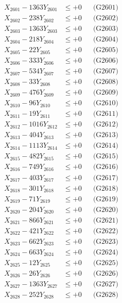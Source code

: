 \documentclass[a4paper,10pt]{article}
\begin{document}
{\begin{align}
\allowbreak
X_{2601} - 1363Y_{2601} &\leq +0 && \text{(G2601)} \\
X_{2602} - 238Y_{2602} &\leq +0 && \text{(G2602)} \\
X_{2603} - 1363Y_{2603} &\leq +0 && \text{(G2603)} \\
X_{2604} - 218Y_{2604} &\leq +0 && \text{(G2604)} \\
X_{2605} - 22Y_{2605} &\leq +0 && \text{(G2605)} \\
X_{2606} - 333Y_{2606} &\leq +0 && \text{(G2606)} \\
X_{2607} - 534Y_{2607} &\leq +0 && \text{(G2607)} \\
X_{2608} - 33Y_{2608} &\leq +0 && \text{(G2608)} \\
X_{2609} - 476Y_{2609} &\leq +0 && \text{(G2609)} \\
X_{2610} - 96Y_{2610} &\leq +0 && \text{(G2610)} \\
\allowbreak
X_{2611} - 19Y_{2611} &\leq +0 && \text{(G2611)} \\
X_{2612} - 1016Y_{2612} &\leq +0 && \text{(G2612)} \\
X_{2613} - 404Y_{2613} &\leq +0 && \text{(G2613)} \\
X_{2614} - 1113Y_{2614} &\leq +0 && \text{(G2614)} \\
X_{2615} - 482Y_{2615} &\leq +0 && \text{(G2615)} \\
X_{2616} - 749Y_{2616} &\leq +0 && \text{(G2616)} \\
X_{2617} - 403Y_{2617} &\leq +0 && \text{(G2617)} \\
X_{2618} - 301Y_{2618} &\leq +0 && \text{(G2618)} \\
X_{2619} - 71Y_{2619} &\leq +0 && \text{(G2619)} \\
X_{2620} - 204Y_{2620} &\leq +0 && \text{(G2620)} \\
\allowbreak
X_{2621} - 866Y_{2621} &\leq +0 && \text{(G2621)} \\
X_{2622} - 421Y_{2622} &\leq +0 && \text{(G2622)} \\
X_{2623} - 662Y_{2623} &\leq +0 && \text{(G2623)} \\
X_{2624} - 663Y_{2624} &\leq +0 && \text{(G2624)} \\
X_{2625} - 12Y_{2625} &\leq +0 && \text{(G2625)} \\
X_{2626} - 26Y_{2626} &\leq +0 && \text{(G2626)} \\
X_{2627} - 1363Y_{2627} &\leq +0 && \text{(G2627)} \\
X_{2628} - 252Y_{2628} &\leq +0 && \text{(G2628)} \\

\end{align}}
\end{document}
